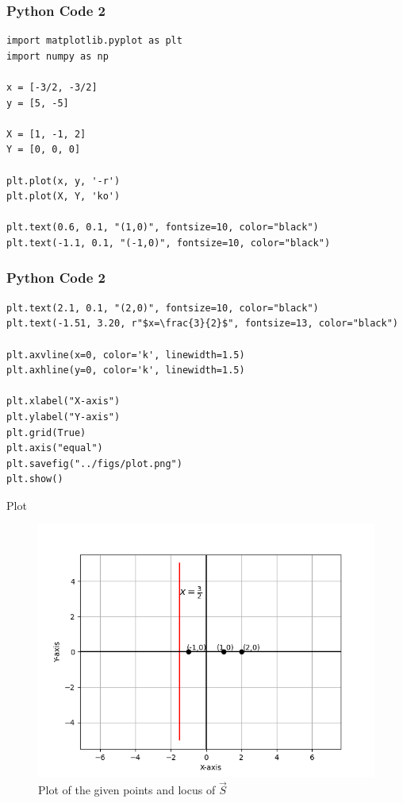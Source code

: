 \documentclass{beamer}
\begin{document}
\begin{frame}[fragile]
    \frametitle{Python Code 2}
    \begin{lstlisting}
import matplotlib.pyplot as plt
import numpy as np

x = [-3/2, -3/2]
y = [5, -5]

X = [1, -1, 2]
Y = [0, 0, 0]

plt.plot(x, y, '-r')
plt.plot(X, Y, 'ko')

plt.text(0.6, 0.1, "(1,0)", fontsize=10, color="black")
plt.text(-1.1, 0.1, "(-1,0)", fontsize=10, color="black")
    \end{lstlisting}
\end{frame}

\begin{frame}[fragile]
    \frametitle{Python Code 2}
    \begin{lstlisting}
plt.text(2.1, 0.1, "(2,0)", fontsize=10, color="black")
plt.text(-1.51, 3.20, r"$x=\frac{3}{2}$", fontsize=13, color="black")

plt.axvline(x=0, color='k', linewidth=1.5)
plt.axhline(y=0, color='k', linewidth=1.5)

plt.xlabel("X-axis")
plt.ylabel("Y-axis")
plt.grid(True)
plt.axis("equal")
plt.savefig("../figs/plot.png")
plt.show()   \end{lstlisting}
\end{frame}

\begin{frame}{Plot}
    \begin{figure}
        \centering
        \includegraphics[width=0.5\columnwidth]{../figs/plot.png}
        \caption{Plot of the given points and locus of $\vec{S}$}
        \label{fig:fig}
    \end{figure}
\end{frame}
\end{document}
